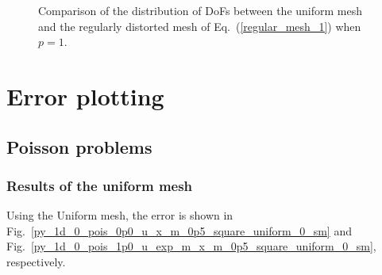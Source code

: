 \documentclass[review,3p]{elsarticle}
\begin{document}
\begin{figure}[!ht]
\centering
   \caption{Comparison of the distribution of DoFs between the uniform mesh and the regularly distorted mesh of Eq.~(\ref{regular_mesh_1}) when $p=1$.}
   \label{measuring_distortion_regularly_1_p_1}
\end{figure}

\newpage
\section{Error plotting}
\subsection{Poisson problems}

\subsubsection{Results of the uniform mesh}
Using the Uniform mesh, the error is shown in Fig.~\ref{py_1d_0_pois_0p0_u_x_m_0p5_square_uniform_0_sm} and Fig.~\ref{py_1d_0_pois_1p0_u_exp_m_x_m_0p5_square_uniform_0_sm}, respectively.
\end{document}
